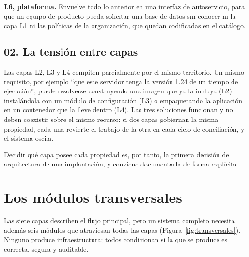 \documentclass[11pt,letterpaper]{article}
\begin{document}
\textbf{L6, plataforma.} Envuelve todo lo anterior en una interfaz de
autoservicio, para que un equipo de producto pueda solicitar una base de datos
sin conocer ni la capa L1 ni las políticas de la organización, que quedan
codificadas en el catálogo.

\subsection*{02. La tensión entre capas}

Las capas L2, L3 y L4 compiten parcialmente por el mismo territorio. Un mismo
requisito, por ejemplo \enquote{que este servidor tenga la versión 1.24 de un
tiempo de ejecución}, puede resolverse construyendo una imagen que ya la
incluya (L2), instalándola con un módulo de configuración (L3) o empaquetando
la aplicación en un contenedor que la lleve dentro (L4). Las tres soluciones
funcionan y no deben coexistir sobre el mismo recurso: si dos capas gobiernan
la misma propiedad, cada una revierte el trabajo de la otra en cada ciclo de
conciliación, y el sistema oscila.

Decidir qué capa posee cada propiedad es, por tanto, la primera decisión de
arquitectura de una implantación, y conviene documentarla de forma explícita.

\section{Los módulos transversales}

Las siete capas describen el flujo principal, pero un sistema completo
necesita además seis módulos que atraviesan todas las capas
(Figura~\ref{fig:transversales}). Ninguno produce infraestructura; todos
condicionan si la que se produce es correcta, segura y auditable.
\end{document}
